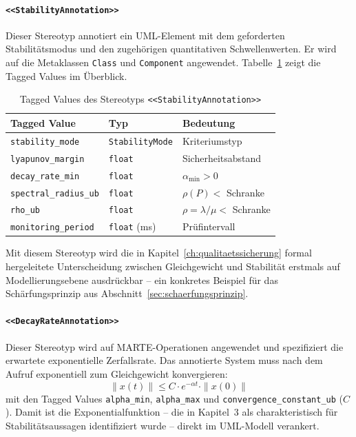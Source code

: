 ﻿\documentclass[a4paper,12pt]{report}
\theoremstyle{definition}
\begin{document}
\paragraph{\texttt{<<StabilityAnnotation>>}}

Dieser Stereotyp annotiert ein UML-Element mit dem geforderten
Stabilitätsmodus und den zugehörigen quantitativen Schwellenwerten.
Er wird auf die Metaklassen \texttt{Class} und \texttt{Component}
angewendet. Tabelle~\ref{tab:stability-annotation} zeigt die Tagged Values
im Überblick.

\begin{table}[H]
	\centering
	\begin{tabular}{@{}lll@{}}
		\toprule
		\textbf{Tagged Value} & \textbf{Typ} & \textbf{Bedeutung} \\
		\midrule
		\texttt{stability\_mode}      & \texttt{StabilityMode} & Kriteriumstyp \\
		\texttt{lyapunov\_margin}     & \texttt{float}         & Sicherheitsabstand \\
		\texttt{decay\_rate\_min}     & \texttt{float}         & $\alpha_{\min} > 0$ \\
		\texttt{spectral\_radius\_ub} & \texttt{float}         & $\rho(P) <$ Schranke \\
		\texttt{rho\_ub}              & \texttt{float}         & $\rho = \lambda/\mu <$ Schranke \\
		\texttt{monitoring\_period}   & \texttt{float} (ms)    & Prüfintervall \\
		\bottomrule
	\end{tabular}
	\caption{Tagged Values des Stereotyps \texttt{<<StabilityAnnotation>>}}
\label{tab:stability-tagged-values}
	\label{tab:stability-annotation}
\end{table}

Mit diesem Stereotyp wird die in Kapitel~\ref{ch:qualitaetssicherung} formal hergeleitete Unterscheidung zwischen Gleichgewicht und Stabilität erstmals auf Modellierungsebene ausdrückbar -- ein konkretes Beispiel für das Schärfungsprinzip aus Abschnitt~\ref{sec:schaerfungsprinzip}.

\paragraph{\texttt{<<DecayRateAnnotation>>}}

Dieser Stereotyp wird auf MARTE-Operationen angewendet und spezifiziert die
erwartete exponentielle Zerfallsrate. Das annotierte System muss nach dem
Aufruf exponentiell zum Gleichgewicht konvergieren:
\[
\|x(t)\| \leq C \cdot e^{-\alpha t} \cdot \|x(0)\|
\]
mit den Tagged Values \texttt{alpha\_min}, \texttt{alpha\_max} und
\texttt{convergence\_constant\_ub} ($C$). Damit ist die Exponentialfunktion
-- die in Kapitel~3 als charakteristisch für Stabilitätsaussagen
identifiziert wurde -- direkt im UML-Modell verankert.
\end{document}
